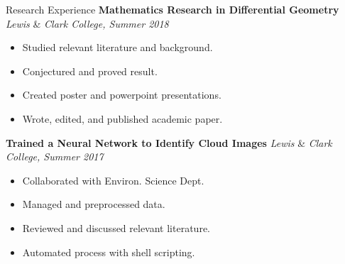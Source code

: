 \documentclass{resume}
\begin{document}
\begin{rSection}{Research Experience}
    \textbf{Mathematics Research in Differential Geometry} \hfill
    \textit{Lewis} \& \textit{Clark College, Summer 2018} 
    \vspace{-3.5mm}
    \begin{multicols}{2}
        \begin{itemize}
            \item Studied relevant literature and background.
            \item Conjectured and proved result.
            \item Created poster and powerpoint presentations.
            \item Wrote, edited, and published academic paper.
        \end{itemize}
    \end{multicols} 
    \vspace{-4mm}
    \textbf{Trained a Neural Network to Identify Cloud Images} \hfill
\textit{Lewis} \& \textit{Clark College, Summer 2017}
    \vspace{-3.5mm}
    \begin{multicols}{2}
        \begin{itemize}
        		\item Collaborated with Environ. Science Dept.
            \item Managed and preprocessed data.
            \item Reviewed and discussed relevant literature.
            \item Automated process with shell scripting.
        \end{itemize}
    \end{multicols} 
    \vspace{-4mm}
\end{rSection}
\end{document}
